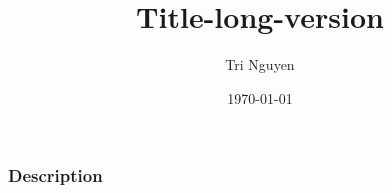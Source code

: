 \documentclass[10pt,xcolor={usenames,dvipsnames,table},aspectratio=169]{beamer}
\title[Title]{Title-long-version}
\author{Tri Nguyen}
\institute[OSU] 
{
Oregon State University 
}
\date{\today} %
\begin{document}
\frame{\titlepage}

\begin{frame}
\frametitle{Description}
\end{frame}
\end{document}
